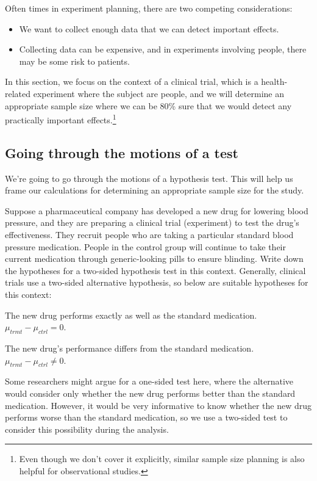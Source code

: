 Often times in experiment planning, there are two competing considerations:
\begin{itemize}
\setlength{\itemsep}{0mm}
\item We want to collect enough data that we can detect important effects.
\item Collecting data can be expensive, and in experiments involving people, there may be some risk to patients.
\end{itemize}
In this section, we focus on the context of a clinical trial, which is a health-related experiment where the subject are people, and we will determine an appropriate sample size where we can be 80\% sure that we would detect any practically important effects.\footnote{Even though we don't cover it explicitly, similar sample size planning is also helpful for observational studies.}


\subsection{Going through the motions of a test}

We're going to go through the motions of a hypothesis test. This will help us frame our calculations for determining an appropriate sample size for the study.

\begin{example}{Suppose a pharmaceutical company has developed a new drug for lowering blood pressure, and they are preparing a clinical trial (experiment) to test the drug's effectiveness. They recruit people who are taking a particular standard blood pressure medication. People in the control group will continue to take their current medication through generic-looking pills to ensure blinding. Write down the hypotheses for a two-sided hypothesis test in this context.}
Generally, clinical trials use a two-sided alternative hypothesis, so below are suitable hypotheses for this context:
\begin{description}
\setlength{\itemsep}{0mm}
\item[$H_0$:] The new drug performs exactly as well as the standard medication. \\
  $\mu_{trmt} - \mu_{ctrl} = 0$.
\item[$H_A$:] The new drug's performance differs from the standard medication. \\
  $\mu_{trmt} - \mu_{ctrl} \neq 0$.
\end{description}
Some researchers might argue for a one-sided test here, where the alternative would consider only whether the new drug performs better than the standard medication. However, it would be very informative to know whether the new drug performs worse than the standard medication, so we use a two-sided test to consider this possibility during the analysis.
\end{example}


